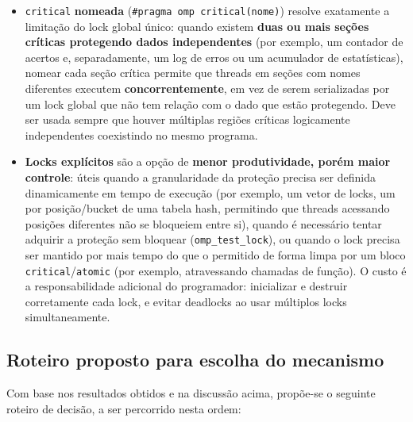 \documentclass[a4paper,12pt]{article}
\begin{document}
\begin{itemize}
    \item \texttt{critical} \textbf{nomeada}
    (\texttt{\#pragma omp critical(nome)}) resolve exatamente a
    limitação do lock global único: quando existem \textbf{duas ou
    mais seções críticas protegendo dados independentes} (por
    exemplo, um contador de acertos e, separadamente, um log de
    erros ou um acumulador de estatísticas), nomear cada seção
    crítica permite que threads em seções com nomes diferentes
    executem \textbf{concorrentemente}, em vez de serem serializadas
    por um lock global que não tem relação com o dado que estão
    protegendo. Deve ser usada sempre que houver múltiplas regiões
    críticas logicamente independentes coexistindo no mesmo programa.

    \item \textbf{Locks explícitos} são a opção de \textbf{menor
    produtividade, porém maior controle}: úteis quando a granularidade
    da proteção precisa ser definida dinamicamente em tempo de
    execução (por exemplo, um vetor de locks, um por posição/bucket
    de uma tabela hash, permitindo que threads acessando posições
    diferentes não se bloqueiem entre si), quando é necessário tentar
    adquirir a proteção sem bloquear (\texttt{omp\_test\_lock}), ou
    quando o lock precisa ser mantido por mais tempo do que o
    permitido de forma limpa por um bloco \texttt{critical}/\texttt{atomic}
    (por exemplo, atravessando chamadas de função). O custo é a
    responsabilidade adicional do programador: inicializar e destruir
    corretamente cada lock, e evitar deadlocks ao usar múltiplos locks
    simultaneamente.
\end{itemize}

\subsection{Roteiro proposto para escolha do mecanismo}

Com base nos resultados obtidos e na discussão acima, propõe-se o
seguinte roteiro de decisão, a ser percorrido nesta ordem:
\end{document}
